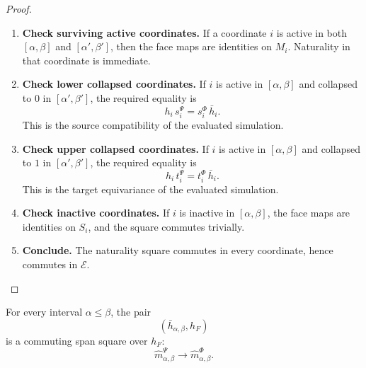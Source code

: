 \begin{proof}
    \leavevmode
    \begin{enumerate}
        \item \textbf{Check surviving active coordinates.}
        If a coordinate \(i\) is active in both
        \([\alpha,\beta]\) and \([\alpha',\beta']\), then the face maps are
        identities on \(M_i\). Naturality in that coordinate is immediate.

        \item \textbf{Check lower collapsed coordinates.}
        If \(i\) is active in \([\alpha,\beta]\) and collapsed to \(0\) in
        \([\alpha',\beta']\), the required equality is
        \[
            h_i\,s_i^\Psi
            =
            s_i^\Phi\,\bar h_i.
        \]
        This is the source compatibility of the evaluated simulation.

        \item \textbf{Check upper collapsed coordinates.}
        If \(i\) is active in \([\alpha,\beta]\) and collapsed to \(1\) in
        \([\alpha',\beta']\), the required equality is
        \[
            h_i\,t_i^\Psi
            =
            t_i^\Phi\,\bar h_i.
        \]
        This is the target equivariance of the evaluated simulation.

        \item \textbf{Check inactive coordinates.}
        If \(i\) is inactive in \([\alpha,\beta]\), the face maps are
        identities on \(S_i\), and the square commutes trivially.

        \item \textbf{Conclude.}
        The naturality square commutes in every coordinate, hence commutes in
        \(\mathcal E\).
    \end{enumerate}
\end{proof}

\begin{proposition}
\label{prop:cmett-simulation-compatibility-interval-spans}
    For every interval \(\alpha\leq\beta\), the pair
    \[
        (\bar h_{\alpha,\beta},h_F)
    \]
    is a commuting span square over \(h_F\):
    \[
        \widehat m_{\alpha,\beta}^{\Psi}
        \longrightarrow
        \widehat m_{\alpha,\beta}^{\Phi}.
    \]
\end{proposition}

